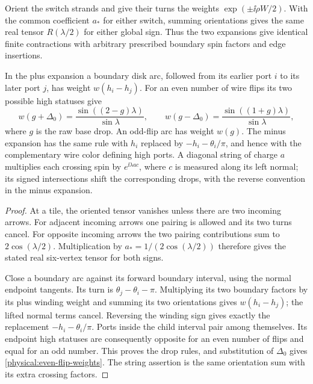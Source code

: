\begin{lemma}\label{physical:winding}
Orient the switch strands and give their turns the weights
\(\exp(\pm\ii\rho W/2)\). With the common coefficient \(a_*\)
for either switch, summing orientations gives the same real tensor
\(R(\lambda/2)\) for either global sign. Thus the two expansions
give identical finite contractions with arbitrary prescribed
boundary spin factors and edge insertions.

In the plus expansion a boundary disk arc, followed from its earlier
port \(i\) to its later port \(j\), has weight \(w(h_i-h_j)\).
For an even number of wire flips its two possible high statuses give
\begin{equation}\label{physical:even-flip-weights}
 w(g+\Delta_0)=\frac{\sin((2-g)\lambda)}{\sin\lambda},\qquad
 w(g-\Delta_0)=\frac{\sin((1+g)\lambda)}{\sin\lambda},
\end{equation}
where \(g\) is the raw base drop. An odd-flip arc has weight \(w(g)\).
The minus expansion has the same rule with
\(h_i\) replaced by \(-h_i-\theta_i/\pi\), and hence with the
complementary wire color defining high ports. A diagonal string of
charge \(a\) multiplies each crossing spin by
\(e^{\ii\lambda ac}\), where \(c\) is measured along its left
normal; its signed intersections shift the corresponding drops,
with the reverse convention in the minus expansion.
\end{lemma}

\begin{proof}
At a tile, the oriented tensor vanishes unless there are two incoming
arrows. For adjacent incoming arrows one pairing is allowed and its
two turns cancel. For opposite incoming arrows the two pairing
contributions sum to \(2\cos(\lambda/2)\). Multiplication by
\(a_*=1/(2\cos(\lambda/2))\) therefore gives the stated real
six-vertex tensor for both signs.

Close a boundary arc against its forward boundary interval, using
the normal endpoint tangents. Its turn is
\(\theta_j-\theta_i-\pi\). Multiplying its two boundary factors
by its plus winding weight and summing its two orientations gives
\(w(h_i-h_j)\); the lifted normal terms cancel. Reversing the
winding sign gives exactly the replacement
\(-h_i-\theta_i/\pi\). Ports inside the child interval pair
among themselves. Its endpoint high statuses are consequently
opposite for an even number of flips and equal for an odd number.
This proves the drop rules, and substitution of \(\Delta_0\)
gives \eqref{physical:even-flip-weights}. The string assertion is
the same orientation sum with its extra crossing factors.
\end{proof}

